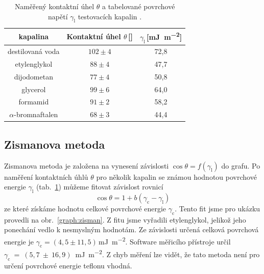 \documentclass{protokol}
\begin{document}
\begin{table}[h]
	\caption{Naměřený kontaktní úhel $\theta$ a tabelované povrchové napětí 
	$\gamma_{\text{l}}$ testovacích kapalin \cite{napetiKapalin}.}
	\label{table:surfTensionLiquid}
	\begin{tabular}{|c|c|c|}\hline
		kapalina  & Kontaktní úhel $\theta$\,[\si{\deg}] &
		$\gamma_{\text{l}}$\,[\si{\milli\joule\per\meter\squared}]\\ \hline
		destilovaná voda & $102\pm4$ & 72,8                              \\
		etylenglykol     & $88\pm4$ & 47,7                              \\
		dijodometan      & $77\pm4$ & 50,8                              \\
		glycerol         & $99\pm6$ & 64,0                              \\
		formamid         & $91\pm2$ & 58,2                              \\
		$\alpha$-bromnaftalen &$68\pm3$ & 44,4  \\ \hline
	\end{tabular}
\end{table}





\subsection{Zismanova metoda}
\par Zismanova metoda je založena na vynesení závislosti $\cos\theta = 
f\left(\gamma_{\text{l}} \right)$ do grafu. Po naměření kontaktních úhlů 
$\theta$ pro několik kapalin se známou hodnotou povrchové energie 
$\gamma_{\text{l}}$ (tab.~\ref{table:surfTensionLiquid}) můžeme fitovat 
závislost rovnicí
\begin{equation}
	\cos\theta = 1 + 
	b \left( \gamma_{\text{c}} - \gamma_{\text{l}} \right)
\end{equation}
ze které získáme hodnotu celkové povrchové energie $\gamma_{\text{c}}$. Tento 
fit jsme pro ukázku provedli na obr.~\ref{graph:zisman}. Z fitu jsme vyřadili 
etylenglykol, jelikož jeho ponechání vedlo k nesmyslným hodnotám. Ze závislosti 
určená celková povrchová energie je $\gamma_{\text{c}} = 
(4,5\pm11,5)$\,\si{\milli\joule\per\meter\squared}. Software měřicího přístroje určil 
$\gamma_{\text{c}}~=~(5,7~\pm~16,9)$~\si{\milli\joule\per\meter\squared}. Z chyb měření lze vidět, že 
tato 
metoda není pro určení povrchové energie teflonu vhodná.
\end{document}
